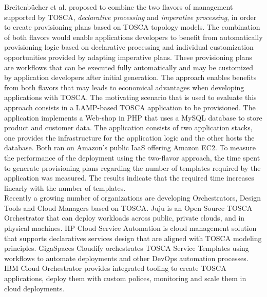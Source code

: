 Breitenb\"{u}cher et al. \cite{breitenbucher2014combining} proposed to combine the two flavors of management
supported by TOSCA, \textit{declarative processing} and \textit{imperative processing}, in order to create
provisioning plans based on TOSCA topology models. The combination of both flavors would enable applications
developers to benefit from automatically provisioning logic based on declarative processing and individual
customization opportunities provided by adapting imperative plans. These provisioning plans are workflows that
can be executed fully automatically and may be customized by application developers after initial generation.
The approach enables benefits from both flavors that may leads to economical advantages when developing applications
with TOSCA. The motivating scenario that is used to evaluate this approach consists in a LAMP-based TOSCA
application to be provisioned. The application implements a Web-shop in PHP that uses a MySQL database to store
product and customer data. The application consists of two application stacks, one provides the infrastructure
for the application logic and the other hosts the database. Both ran on Amazon's public IaaS offering
Amazon EC2. To measure the performance of the deployment using the two-flavor approach, the time spent to
generate provisioning plans regarding the number of templates required by the application was measured.
The results indicate that the required time increases linearly with the number of templates.\\

Recently a growing number of organizations are developing Orchestrators, Design Tools and Cloud Managers
based on TOSCA. Juju is an Open Source TOSCA Orchestrator that can deploy workloads across public, private clouds,
and in physical machines. HP Cloud Service Automation is cloud management solution that supports declaratives
services design that are aligned with TOSCA modeling principles. GigaSpaces Cloudify orchestrates TOSCA Service
Templates using workflows to automate deployments and other DevOps automation processes. IBM Cloud Orchestrator
provides integrated tooling to create TOSCA applications, deploy them with custom polices, monitoring and scale
them in cloud deployments.\\
